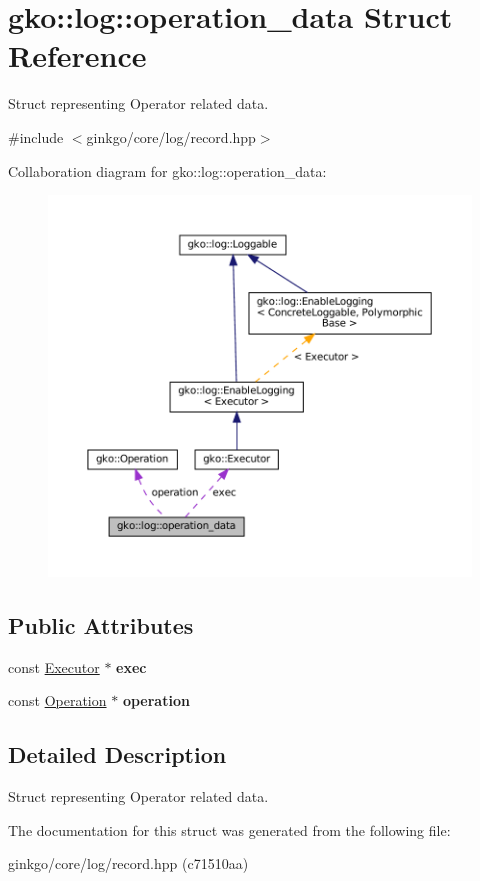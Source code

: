 \hypertarget{structgko_1_1log_1_1operation__data}{}\section{gko\+:\+:log\+:\+:operation\+\_\+data Struct Reference}
\label{structgko_1_1log_1_1operation__data}


Struct representing Operator related data.  




{\ttfamily \#include $<$ginkgo/core/log/record.\+hpp$>$}



Collaboration diagram for gko\+:\+:log\+:\+:operation\+\_\+data\+:
\nopagebreak
\begin{figure}[H]
\begin{center}
\leavevmode
\includegraphics[width=350pt]{structgko_1_1log_1_1operation__data__coll__graph}
\end{center}
\end{figure}
\subsection*{Public Attributes}
\begin{DoxyCompactItemize}
\item 
\mbox{\label{structgko_1_1log_1_1operation__data_ad5a3a3e76a8dc5b8ca240084585fd6e7}} 
const \hyperlink{classgko_1_1Executor}{Executor} $\ast$ {\bfseries exec}
\item 
\mbox{\label{structgko_1_1log_1_1operation__data_a92dc7de984a101b8f93a05d3f3502d7c}} 
const \hyperlink{classgko_1_1Operation}{Operation} $\ast$ {\bfseries operation}
\end{DoxyCompactItemize}


\subsection{Detailed Description}
Struct representing Operator related data. 

The documentation for this struct was generated from the following file\+:\begin{DoxyCompactItemize}
\item 
ginkgo/core/log/record.\+hpp (c71510aa)\end{DoxyCompactItemize}
